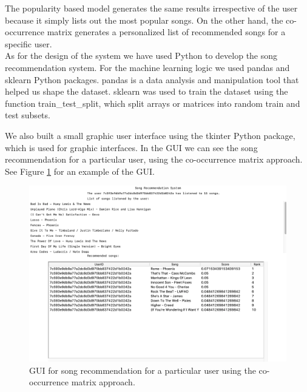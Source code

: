 \documentclass{jot}
\begin{document}
The popularity based model generates the same results irrespective of the user because it simply lists out the most popular songs. On the other hand, the co-occurrence matrix generates a personalized list of recommended songs for a specific user.\\

As for the design of the system we have used Python to develop the song recommendation system. For the machine learning logic we used pandas and sklearn Python packages. pandas is a data analysis and manipulation tool that helped us shape the dataset. sklearn was used to train the dataset using the function train\_test\_split, which split arrays or matrices into random train and test subsets.

We also built a small graphic user interface using the tkinter Python package, which is used for graphic interfaces. In the GUI we can see the song recommendation for a particular user, using the co-occurrence matrix approach. See Figure \ref{fig:design} for an example of the GUI.

\begin{figure}[h!]
    \centering%
    \includegraphics[width=\textwidth]{design}
    \caption{GUI for song recommendation for a particular user using the co-occurrence matrix approach.}
    \label{fig:design}
\end{figure}%
\end{document}
